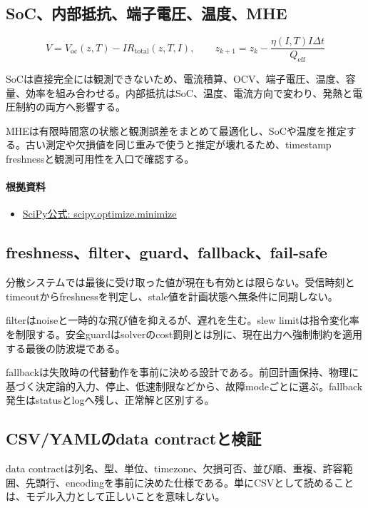 \documentclass[a4paper,11pt]{article}
\begin{document}
\subsection{SoC、内部抵抗、端子電圧、温度、MHE}
\[
V=V_{\mathrm{oc}}(z,T)-IR_{\mathrm{total}}(z,T,I),\qquad z_{k+1}=z_k-\frac{\eta(I,T)I\Delta t}{Q_{\mathrm{eff}}}
\]

SoCは直接完全には観測できないため、電流積算、OCV、端子電圧、温度、容量、効率を組み合わせる。内部抵抗はSoC、温度、電流方向で変わり、発熱と電圧制約の両方へ影響する。


MHEは有限時間窓の状態と観測誤差をまとめて最適化し、SoCや温度を推定する。古い測定や欠損値を同じ重みで使うと推定が壊れるため、timestamp freshnessと観測可用性を入口で確認する。

\paragraph{根拠資料}
\begin{itemize}[leftmargin=1.6em]
\item \href{https://docs.scipy.org/doc/scipy/reference/generated/scipy.optimize.minimize.html}{SciPy公式: scipy.optimize.minimize}
\end{itemize}

\subsection{freshness、filter、guard、fallback、fail-safe}
分散システムでは最後に受け取った値が現在も有効とは限らない。受信時刻とtimeoutからfreshnessを判定し、stale値を計画状態へ無条件に同期しない。


filterはnoiseと一時的な飛び値を抑えるが、遅れを生む。slew limitは指令変化率を制限する。安全guardはsolverのcost罰則とは別に、現在出力へ強制制約を適用する最後の防波堤である。


fallbackは失敗時の代替動作を事前に決める設計である。前回計画保持、物理に基づく決定論的入力、停止、低速制限などから、故障modeごとに選ぶ。fallback発生はstatusとlogへ残し、正常解と区別する。



\subsection{CSV/YAMLのdata contractと検証}
data contractは列名、型、単位、timezone、欠損可否、並び順、重複、許容範囲、先頭行、encodingを事前に決めた仕様である。単にCSVとして読めることは、モデル入力として正しいことを意味しない。
\end{document}
